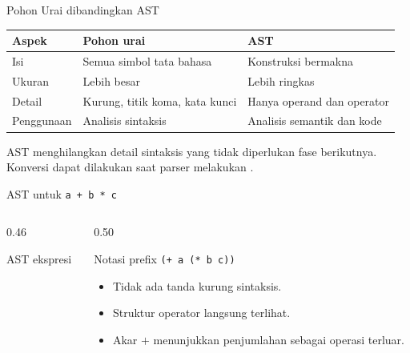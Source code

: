 \documentclass[aspectratio=169,10pt,t]{beamer}
\begin{document}
\begin{frame}{Pohon Urai dibandingkan AST}
  \small
  \setlength{\tabcolsep}{4pt}
  \begin{tabular}{@{}p{3.2cm}p{5.2cm}p{5.0cm}@{}}
    \toprule
    \textbf{Aspek} & \textbf{Pohon urai} & \textbf{AST} \\
    \midrule
    Isi & Semua simbol tata bahasa & Konstruksi bermakna \\
    Ukuran & Lebih besar & Lebih ringkas \\
    Detail & Kurung, titik koma, kata kunci & Hanya operand dan operator \\
    Penggunaan & Analisis sintaksis & Analisis semantik dan kode \\
    \bottomrule
  \end{tabular}

  \vspace{5pt}
  {\footnotesize\color{ubbblue!80}AST menghilangkan detail sintaksis
  yang tidak diperlukan fase berikutnya. Konversi dapat dilakukan saat
  parser melakukan .}
\end{frame}

\begin{frame}{AST untuk \texttt{a + b * c}}
  \begin{columns}[T,onlytextwidth]
    \begin{column}{0.46\textwidth}
      \centering
      \par {\scriptsize AST ekspresi}
    \end{column}
    \begin{column}{0.50\textwidth}
      \begin{block}{Notasi prefix}
        \centering
        \texttt{(+ a (* b c))}
      \end{block}
      \begin{itemize}
        \item Tidak ada tanda kurung sintaksis.
        \item Struktur operator langsung terlihat.
        \item Akar \(+\) menunjukkan penjumlahan sebagai operasi
              terluar.
      \end{itemize}
    \end{column}
  \end{columns}
\end{frame}
\end{document}
